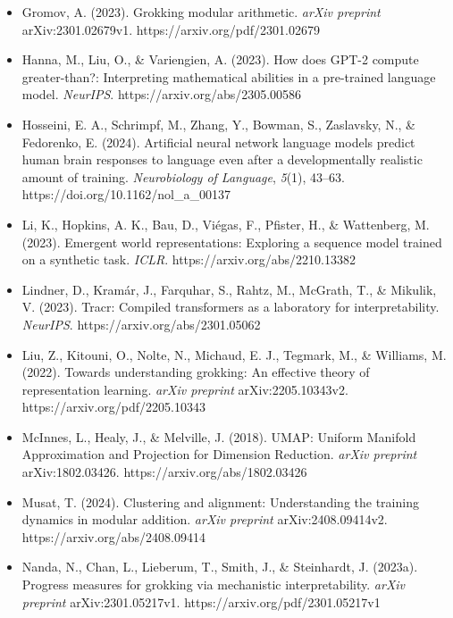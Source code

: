 \documentclass[
  11pt,
  a4paper,
]{article}
\begin{document}
\begin{itemize}
  Geva, M., Caciularu, A., Wang, K., \& Goldberg, Y. (2022). Transformer
  feed-forward layers build predictions by promoting concepts in the
  vocabulary space. \emph{EMNLP}, 30--45.
  https://aclanthology.org/2022.emnlp-main.3/
\item
  Gromov, A. (2023). Grokking modular arithmetic. \emph{arXiv preprint}
  arXiv:2301.02679v1. https://arxiv.org/pdf/2301.02679
\item
  Hanna, M., Liu, O., \& Variengien, A. (2023). How does GPT-2 compute
  greater-than?: Interpreting mathematical abilities in a pre-trained
  language model. \emph{NeurIPS}. https://arxiv.org/abs/2305.00586
\item
  Hosseini, E. A., Schrimpf, M., Zhang, Y., Bowman, S., Zaslavsky, N.,
  \& Fedorenko, E. (2024). Artificial neural network language models
  predict human brain responses to language even after a developmentally
  realistic amount of training. \emph{Neurobiology of Language},
  \emph{5}(1), 43--63. https://doi.org/10.1162/nol\_a\_00137
\item
  Li, K., Hopkins, A. K., Bau, D., Viégas, F., Pfister, H., \&
  Wattenberg, M. (2023). Emergent world representations: Exploring a
  sequence model trained on a synthetic task. \emph{ICLR}.
  https://arxiv.org/abs/2210.13382
\item
  Lindner, D., Kramár, J., Farquhar, S., Rahtz, M., McGrath, T., \&
  Mikulik, V. (2023). Tracr: Compiled transformers as a laboratory for
  interpretability. \emph{NeurIPS}. https://arxiv.org/abs/2301.05062
\item
  Liu, Z., Kitouni, O., Nolte, N., Michaud, E. J., Tegmark, M., \&
  Williams, M. (2022). Towards understanding grokking: An effective
  theory of representation learning. \emph{arXiv preprint}
  arXiv:2205.10343v2. https://arxiv.org/pdf/2205.10343
\item
  McInnes, L., Healy, J., \& Melville, J. (2018). UMAP: Uniform Manifold
  Approximation and Projection for Dimension Reduction. \emph{arXiv
  preprint} arXiv:1802.03426. https://arxiv.org/abs/1802.03426
\item
  Musat, T. (2024). Clustering and alignment: Understanding the training
  dynamics in modular addition. \emph{arXiv preprint}
  arXiv:2408.09414v2. https://arxiv.org/abs/2408.09414
\item
  Nanda, N., Chan, L., Lieberum, T., Smith, J., \& Steinhardt, J.
  (2023a). Progress measures for grokking via mechanistic
  interpretability. \emph{arXiv preprint} arXiv:2301.05217v1.
  https://arxiv.org/pdf/2301.05217v1

\end{itemize}
\end{document}
